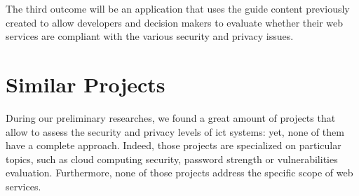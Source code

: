 The third outcome will be an application that uses the guide content previously created to allow developers and decision makers to evaluate whether their web services are compliant with the various security and privacy issues.

\section{Similar Projects}
\label{sec:introduction_similar}

During our preliminary researches, we found a great amount of projects that allow to assess the security and privacy levels of \gls{ict} systems: yet, none of them have a complete approach. Indeed, those projects are specialized on particular topics, such as \gls{cloud} computing security, password strength or vulnerabilities evaluation. Furthermore, none of those projects address the specific scope of web services.

